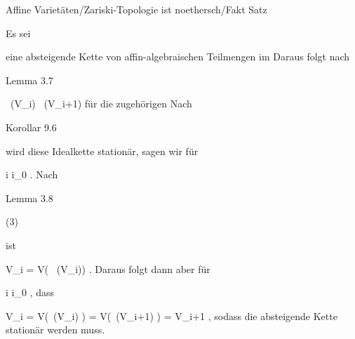 {Affine Varietäten/Zariski-Topologie ist noethersch/Fakt}
{Satz}
{}
{



\faktsituation {}
\faktzusatz {}
\faktzusatz {}




}
{




Es sei

 {  }

eine absteigende Kette von affin-algebraischen Teilmengen im
 Daraus folgt nach

Lemma 3.7


\mavergleichskette
{\vergleichskette
{  \, (V_i)
}
{ \subseteq }{  \, (V_{i+1})
}
{  }{
}
{    }{
}
{   }{
}
}
{}{}{}
für die zugehörigen
Nach

Korollar 9.6

wird diese Idealkette stationär, sagen wir für

\mavergleichskette
{\vergleichskette
{ i
}
{ \geq }{i_0
}
{  }{
}
{    }{
}
{   }{
}
}
{}{}{.}
Nach

Lemma 3.8

 (3)

ist

\mavergleichskette
{\vergleichskette
{ V_i
}
{ = }{ V( \, (V_i))
}
{  }{
}
{    }{
}
{   }{
}
}
{}{}{.}
Daraus folgt dann aber für

\mavergleichskette
{\vergleichskette
{ i
}
{ \geq }{i_0
}
{  }{
}
{    }{
}
{   }{
}
}
{}{}{,}
dass

\mavergleichskettedisp
{\vergleichskette
{ V_i
}
{ =} { V(  \,(V_i)  )
}
{ =} { V(  \,(V_{i+1})  )
}
{ =} { V_{i+1}
}
{ } {
}
}
{}{}{,}
sodass die absteigende Kette stationär werden muss.




}





